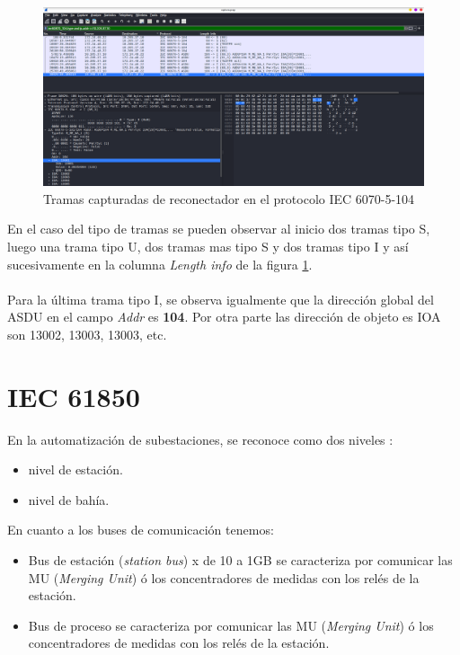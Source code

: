 \documentclass[a5paper]{book}%
\begin{document}
\begin{figure}[H]
	\centering
	\caption{Tramas capturadas de reconectador en el protocolo IEC 6070-5-104}
	\label{fig:reco104}
	\includegraphics[width=\linewidth]{reco_104}
\end{figure}

En el caso del tipo de tramas se pueden observar al inicio dos tramas tipo S, luego una trama tipo U, dos tramas mas tipo S y dos tramas tipo I y así sucesivamente en la columna \textit{Length info} de la figura \ref{fig:reco104}.\\\\

Para la última trama tipo I, se observa igualmente que la dirección global del ASDU en el campo \textit{Addr} es \textbf{104}. Por otra parte las dirección de objeto es IOA son 13002, 13003, 13003, etc.


\section{IEC 61850}

En la automatización de subestaciones, se reconoce como dos niveles :

\begin{itemize}
\item nivel de estación.
\item nivel de bahía.
\end{itemize}

En cuanto a los buses de comunicación tenemos:

\begin{itemize}
	\item Bus de estación (\textit{station bus}) x de 10 a 1GB se caracteriza por comunicar las MU (\textit{Merging Unit}) ó los concentradores de medidas con los relés de la estación.
    \item Bus de proceso se caracteriza por comunicar las MU (\textit{Merging Unit}) ó los concentradores de medidas con los relés de la estación.
\end{itemize}
\end{document}
